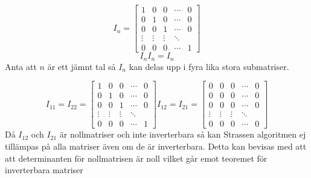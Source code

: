  $$ I_n =
 \begin{bmatrix}
   1 & 0 & 0 & \cdots & 0 \\
  0 & 1 & 0 & \cdots & 0 \\
  0 & 0 & 1 & \cdots & 0 \\
  \vdots  & \vdots  & \vdots & \ddots  \\
  0 & 0 & 0 & \cdots & 1
 \end{bmatrix}
 $$
 $$I_nI_n=I_n$$
 Anta att $n$ är ett jämnt tal så $I_n$ kan delas upp i fyra lika stora submatriser.
 
  $$ I_{11}=I_{22} =
 \begin{bmatrix}
   1 & 0 & 0 & \cdots & 0 \\
  0 & 1 & 0 & \cdots & 0 \\
  0 & 0 & 1 & \cdots & 0 \\
  \vdots  & \vdots  & \vdots & \ddots  \\
  0 & 0 & 0 & \cdots & 1
 \end{bmatrix}
 I_{12}=I_{21}=
  \begin{bmatrix}
   0 & 0 & 0 & \cdots & 0 \\
  0 & 0 & 0 & \cdots & 0 \\
  0 & 0 & 0 & \cdots & 0 \\
  \vdots  & \vdots  & \vdots & \ddots  \\
  0 & 0 & 0 & \cdots & 0
 \end{bmatrix}
 $$
 Då $I_{12}$ och $I_{21}$ är nollmatriser och inte inverterbara så kan Strassen algoritmen ej tillämpas på alla matriser även om de är inverterbara. Detta kan bevisas med att att determinanten för nollmatrisen är noll vilket går emot teoremet för inverterbara matriser \cite{Setyadi} 
 

